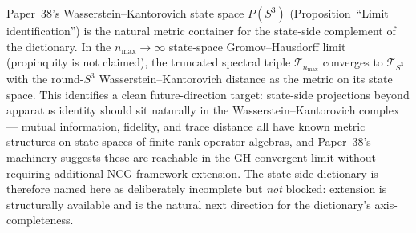 \documentclass[11pt]{article}
\begin{document}
Paper~38's Wasserstein--Kantorovich state space $P(S^3)$
(Proposition~``Limit identification'') is the natural metric
container for the state-side complement of the dictionary.  In the
$n_{\max} \to \infty$ state-space Gromov--Hausdorff limit (propinquity is not claimed), the truncated spectral
triple $\mathcal{T}_{n_{\max}}$ converges to $\mathcal{T}_{S^3}$ with
the round-$S^3$ Wasserstein--Kantorovich distance as the metric on
its state space.  This identifies a clean future-direction target:
state-side projections beyond apparatus identity should sit naturally
in the Wasserstein--Kantorovich complex --- mutual information,
fidelity, and trace distance all have known metric structures on
state spaces of finite-rank operator algebras, and Paper~38's
machinery suggests these are reachable in the GH-convergent limit
without requiring additional NCG framework extension.  The state-side
dictionary is therefore named here as deliberately incomplete but
\emph{not} blocked: extension is structurally available and is the
natural next direction for the dictionary's axis-completeness.
\end{document}
